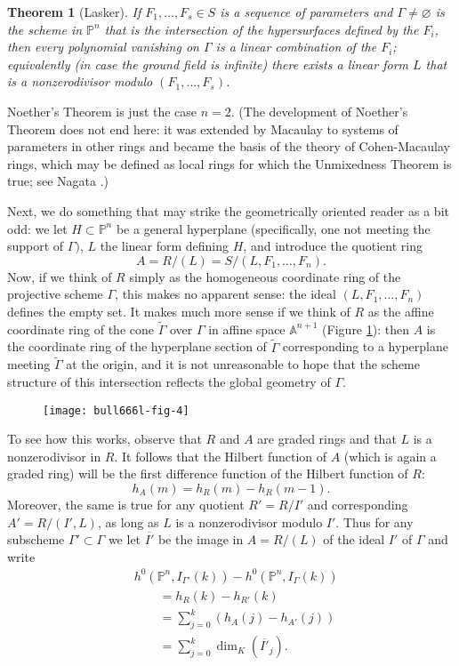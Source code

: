 \documentclass{bull-l}
\newtheorem{thm}[prop]{Theorem}
\theoremstyle{pplain}
\theoremstyle{definition}
\begin{document}
\begin{thm}[Lasker] \label{thm:eight}
If $F_1,\dots,F_s\in S$ is a sequence of parameters and $\Gamma\ne \varnothing
$ is the scheme
in $\mathbb{P}^n$ that is the intersection of the hypersurfaces defined by the
$F_i$, then every polynomial vanishing on $\Gamma$ is a linear combination of
the $F_i$; equivalently \textup{(}in case the ground field is
infinite\textup{)} there exists a linear form $L$ that is a nonzerodivisor
modulo $(F_1,\dots,F_s)$.  
\end{thm}

Noether's Theorem is just the case $n=2$. (The
development of Noether's Theorem does not end here: it was extended by Macaulay
\cite[sections 48--53]{M} to systems of parameters in other rings and became
the basis of the theory of Cohen-Macaulay rings, which may be defined as local
rings for which the Unmixedness Theorem is true; see Nagata \cite{Na}.)

Next, we do something that may strike the geometrically oriented reader as a
bit odd: we let  $H\subset \mathbb{P}^n$ be a general hyperplane (specifically,
one not meeting the support of $\Gamma)$, $L$ the linear form defining $H$,
and introduce the quotient ring
\[A=R/(L)=S/(L,F_1,\dots,F_n).\]
Now, if we think of $R$ simply as the homogeneous coordinate ring of the
projective scheme $\Gamma$, this makes no apparent sense: the ideal
$(L,F_1,\dots,F_n)$ defines the empty set.  It makes much more sense if we
think of $R$ as the affine coordinate ring of the cone $\widetilde \Gamma$ over
$\Gamma$  in affine space $\mathbb{A}^{n+1}$ (Figure 
\ref{fig:four}): then $A$ is the coordinate ring
of the hyperplane section of $\widetilde \Gamma$ corresponding to a hyperplane
meeting $\widetilde \Gamma$ at the origin, and it is not unreasonable to hope
that the scheme structure of this intersection reflects the global geometry of
$\Gamma$.

\begin{figure}
\texttt{[image: bull666l-fig-4]}
\caption{}
\label{fig:four}
\end{figure}

To see how this works, observe that $R$ and $A$ are graded rings and that $L$
is a nonzerodivisor in $R$.  It follows that the Hilbert function of $A$
(which is again a graded ring) will be the first difference function of the
Hilbert function of $R$:
\[h_A(m)=h_R(m)-h_R(m-1).\]
Moreover, the same is true for any quotient $R'=R/I'$ and corresponding
$A'=R/(I',L)$, as long as $L$ is a nonzerodivisor modulo $I'$.  Thus for any 
subscheme  $\Gamma'\subset \Gamma$ we let $\overline{I'}$ be the image in 
$A=R/(L)$ of the ideal $I'$ of $\Gamma$ and write
\begin{equation*} 
\begin{split}
&h^0(\mathbb{P}^n,I_{\Gamma'}(k)) -h^0(\mathbb{P}^n,I_\Gamma(k))\\ 
&\qquad=h_R(k)-h_{R'}(k)\\
&\qquad =\sum^k_{j=0} (h_A(j)-h_{A'}(j))\\
&\qquad =\sum^k_{j=0}\dim _{K} (\overline {I'}_j).
\end{split}
\end{equation*}
\end{document}
